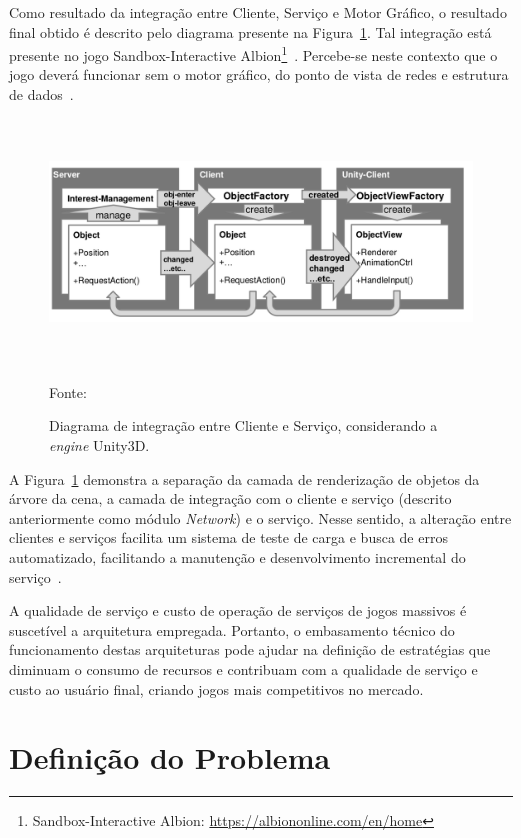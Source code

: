 Como resultado da integração entre Cliente, Serviço e Motor Gráfico, o resultado final obtido é descrito pelo diagrama presente na Figura~\ref{fig:integracao_unity_albion}.
%
Tal integração está presente no jogo Sandbox-Interactive Albion\footnote{Sandbox-Interactive Albion: \url{https://albiononline.com/en/home}}~\cite{albion_online_unite}.
%
Percebe-se neste contexto que o jogo deverá funcionar sem o motor gráfico, do ponto de vista de redes e estrutura de dados~\cite{albion_online_unite}.


\begin{figure}[htb!]
\caption{Diagrama de integração entre Cliente e Serviço, considerando a \textit{engine} Unity3D.}
\label{fig:integracao_unity_albion}
\includegraphics[height=6.5cm]{img/cap2/integracao_unity_albion.png}
\centering

Fonte:~\cite{albion_online_unite}
\end{figure}

A Figura~\ref{fig:integracao_unity_albion} demonstra a separação da camada de renderização de objetos da árvore da cena, a camada de integração com o cliente e serviço (descrito anteriormente como módulo \textit{Network}) e o serviço.
%
Nesse sentido, a alteração entre clientes e serviços facilita um sistema de teste de carga e busca de erros automatizado, facilitando a manutenção e desenvolvimento incremental do serviço~\cite{albion_online_unite}.


A qualidade de serviço e custo de operação de serviços de jogos massivos é suscetível a arquitetura empregada.
%
Portanto, o embasamento técnico do funcionamento destas arquiteturas pode ajudar na definição de estratégias que diminuam o consumo de recursos e contribuam com a qualidade de serviço e custo ao usuário final, criando jogos mais competitivos no mercado.


\section{Definição do Problema}




